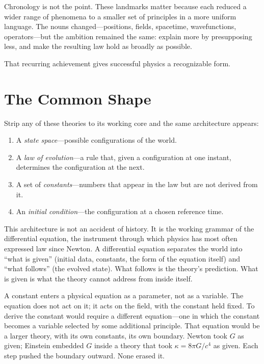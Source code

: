 \documentclass[11pt,a4paper]{book}
\begin{document}
Chronology is not the point.  These landmarks matter because each reduced a wider range of phenomena to a smaller set of principles in a more uniform language.  The nouns changed---positions, fields, spacetime, wavefunctions, operators---but the ambition remained the same: explain more by presupposing less, and make the resulting law hold as broadly as possible.

That recurring achievement gives successful physics a recognizable form.

\section*{The Common Shape}

Strip any of these theories to its working core and the same architecture appears:

\begin{enumerate}
\item A \emph{state space}---possible configurations of the world.
\item A \emph{law of evolution}---a rule that, given a configuration at one instant, determines the configuration at the next.
\item A set of \emph{constants}---numbers that appear in the law but are not derived from it.
\item An \emph{initial condition}---the configuration at a chosen reference time.
\end{enumerate}

This architecture is not an accident of history.  It is the working grammar of the differential equation, the instrument through which physics has most often expressed law since Newton.  A differential equation separates the world into ``what is given'' (initial data, constants, the form of the equation itself) and ``what follows'' (the evolved state).  What follows is the theory's prediction.  What is given is what the theory cannot address from inside itself.

A constant enters a physical equation as a parameter, not as a variable.  The equation does not act on it; it acts on the field, with the constant held fixed.  To derive the constant would require a different equation---one in which the constant becomes a variable selected by some additional principle.  That equation would be a larger theory, with its own constants, its own boundary.  Newton took $G$ as given; Einstein embedded $G$ inside a theory that took $\kappa = 8\pi G/c^4$ as given.  Each step pushed the boundary outward.  None erased it.
\end{document}
